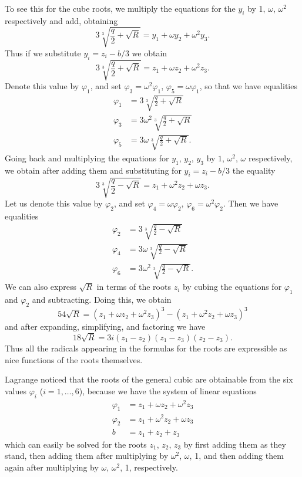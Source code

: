 \documentclass[11pt]{article}
\theoremstyle{definition}
\begin{document}
To see this for the cube roots, we multiply the equations for the
$y_i$ by 1, $\omega$, $\omega^2$ respectively and add, obtaining
$$
3 \sqrt[3]{\frac{q}{2}+\sqrt{R}} = y_1 + \omega y_2 + \omega^2 y_3.
$$
Thus if we substitute $y_i = z_i - b/3$ we obtain
$$
3 \sqrt[3]{\frac{q}{2}+\sqrt{R}} = z_1 + \omega z_2 + \omega^2 z_3.
$$
Denote this value by $\varphi_1$, and set
$\varphi_3=\omega^2\varphi_1$, $\varphi_5=\omega\varphi_1$, so that we
have equalities
\begin{align*}
\varphi_1 &= 3 \sqrt[3]{\frac{q}{2}+\sqrt{R}} \\
\varphi_3 &= 3 \omega^2 \sqrt[3]{\frac{q}{2}+\sqrt{R}} \\
\varphi_5 &= 3 \omega \sqrt[3]{\frac{q}{2}+\sqrt{R}}.
\end{align*}
Going back and multiplying the equations for $y_1$, $y_2$, $y_3$ by
$1$, $\omega^2$, $\omega$ respectively, we obtain after adding them
and substituting for $y_i = z_i - b/3$ the equality
$$
3 \sqrt[3]{\frac{q}{2}-\sqrt{R}} = z_1 + \omega^2 z_2 + \omega z_3.
$$ 
Let us denote this value by $\varphi_2$, and set $\varphi_4 =
\omega \varphi_2$, $\varphi_6 = \omega^2 \varphi_2$. Then we have
equalities 
\begin{align*}
\varphi_2 &= 3 \sqrt[3]{\frac{q}{2}-\sqrt{R}} \\
\varphi_4 &= 3 \omega \sqrt[3]{\frac{q}{2}-\sqrt{R}} \\
\varphi_6 &= 3 \omega^2 \sqrt[3]{\frac{q}{2}-\sqrt{R}}.
\end{align*}
We can also express $\sqrt{R}$ in terms of the roots $z_i$ by cubing
the equations for $\varphi_1$ and $\varphi_2$ and subtracting. Doing
this, we obtain
$$ 54 \sqrt{R} = (z_1+\omega z_2+\omega^2 z_3)^3 - (z_1+\omega^2
z_2+\omega z_3)^3
$$
and after expanding, simplifying, and factoring we have
$$
18\sqrt{R} = 3i (z_1-z_2)(z_1-z_3)(z_2-z_3).
$$
Thus all the radicals appearing in the formulas for the roots are
expressible as nice functions of the roots themselves. 


Lagrange noticed that the roots of the general cubic are obtainable
from the six values $\varphi_i$ ($i = 1, \dots, 6$), because we have
the system of linear equations 
\begin{equation}\label{eq:Lagrange-system}
\begin{aligned}
\varphi_1 &= z_1 + \omega z_2 + \omega^2 z_3\\
\varphi_2 &= z_1 + \omega^2 z_2 + \omega z_3\\
b & = z_1 + z_2 +z_3
\end{aligned}
\end{equation}
which can easily be solved for the roots $z_1$, $z_2$, $z_3$ by first
adding them as they stand, then adding them after multiplying by
$\omega^2$, $\omega$, 1, and then adding them again after multiplying
by $\omega$, $\omega^2$, 1, respectively.
\end{document}
